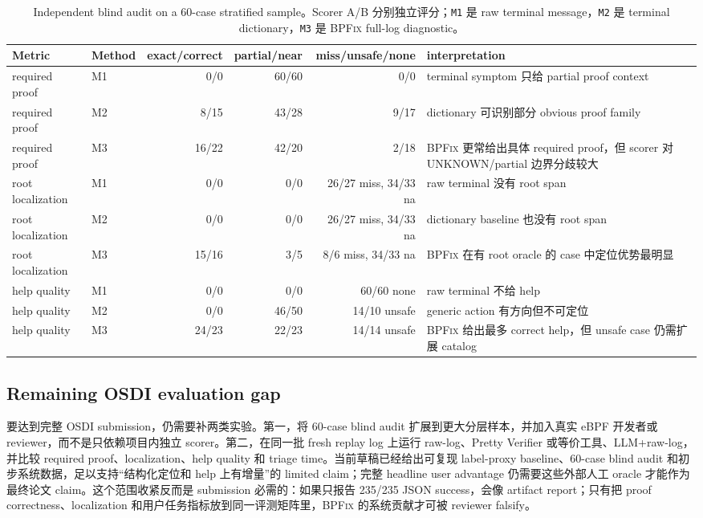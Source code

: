 \documentclass[letterpaper,twocolumn,10pt]{article}
\newcommand{\sys}{\textsc{BPFix}\xspace}
\newcommand{\code}[1]{\texttt{#1}}
\begin{document}
\begin{table}[t]
\centering
\small
\caption{Independent blind audit on a 60-case stratified sample。Scorer A/B 分别独立评分；\code{M1} 是 raw terminal message，\code{M2} 是 terminal dictionary，\code{M3} 是 \sys full-log diagnostic。}
\label{tab:blind-audit}
\begin{tabularx}{\textwidth}{@{}l l r r r X@{}}
\toprule
Metric & Method & exact/correct & partial/near & miss/unsafe/none & interpretation \\
\midrule
required proof & M1 & 0/0 & 60/60 & 0/0 & terminal symptom 只给 partial proof context \\
required proof & M2 & 8/15 & 43/28 & 9/17 & dictionary 可识别部分 obvious proof family \\
required proof & M3 & 16/22 & 42/20 & 2/18 & \sys 更常给出具体 required proof，但 scorer 对 UNKNOWN/partial 边界分歧较大 \\
\midrule
root localization & M1 & 0/0 & 0/0 & 26/27 miss, 34/33 na & raw terminal 没有 root span \\
root localization & M2 & 0/0 & 0/0 & 26/27 miss, 34/33 na & dictionary baseline 也没有 root span \\
root localization & M3 & 15/16 & 3/5 & 8/6 miss, 34/33 na & \sys 在有 root oracle 的 case 中定位优势最明显 \\
\midrule
help quality & M1 & 0/0 & 0/0 & 60/60 none & raw terminal 不给 help \\
help quality & M2 & 0/0 & 46/50 & 14/10 unsafe & generic action 有方向但不可定位 \\
help quality & M3 & 24/23 & 22/23 & 14/14 unsafe & \sys 给出最多 correct help，但 unsafe case 仍需扩展 catalog \\
\bottomrule
\end{tabularx}
\end{table}

\subsection{Remaining OSDI evaluation gap}

要达到完整 OSDI submission，仍需要补两类实验。第一，将 60-case blind audit 扩展到更大分层样本，并加入真实 eBPF 开发者或 reviewer，而不是只依赖项目内独立 scorer。第二，在同一批 fresh replay log 上运行 raw-log、Pretty Verifier 或等价工具、LLM+raw-log，并比较 required proof、localization、help quality 和 triage time。当前草稿已经给出可复现 label-proxy baseline、60-case blind audit 和初步系统数据，足以支持“结构化定位和 help 上有增量”的 limited claim；完整 headline user advantage 仍需要这些外部人工 oracle 才能作为最终论文 claim。这个范围收紧反而是 submission 必需的：如果只报告 235/235 JSON success，会像 artifact report；只有把 proof correctness、localization 和用户任务指标放到同一评测矩阵里，\sys 的系统贡献才可被 reviewer falsify。
\end{document}
